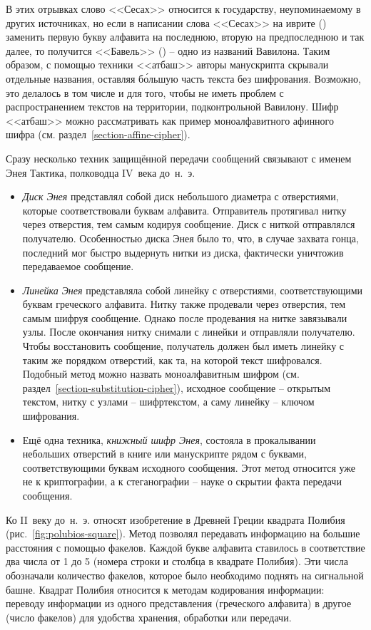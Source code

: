 В этих отрывках слово <<Сесах>> относится к государству, неупоминаемому в других источниках, но если в написании слова <<Сесах>> на иврите () заменить первую букву алфавита на последнюю, вторую на предпоследнюю и так далее, то получится <<Бавель>> () -- одно из названий Вавилона. Таким образом, с помощью техники <<атбаш>> авторы манускрипта скрывали отдельные названия, оставляя б\'{о}льшую часть текста без шифрования. Возможно, это делалось в том числе и для того, чтобы не иметь проблем с распространением текстов на территории, подконтрольной Вавилону. Шифр <<атбаш>> можно рассматривать как пример моноалфавитного афинного шифра (см. раздел~\ref{section-affine-cipher}).

Сразу несколько техник защищённой передачи сообщений связывают с именем Энея Тактика, полководца IV~века до~н.~э.
\begin{itemize}
	\item \emph{Диск Энея} представлял собой диск небольшого диаметра с отверстиями, которые соответствовали буквам алфавита. Отправитель протягивал нитку через отверстия, тем самым кодируя сообщение. Диск с ниткой отправлялся получателю. Особенностью диска Энея было то, что, в случае захвата гонца, последний мог быстро выдернуть нитки из диска, фактически уничтожив передаваемое сообщение.
	\item \emph{Линейка Энея} представляла собой линейку с отверстиями, соответствующими буквам греческого алфавита. Нитку также продевали через отверстия, тем самым шифруя сообщение. Однако после продевания на нитке завязывали узлы. После окончания нитку снимали с линейки и отправляли получателю. Чтобы восстановить сообщение, получатель должен был иметь линейку с таким же порядком отверстий, как та, на которой текст шифровался. Подобный метод можно назвать моноалфавитным шифром (см. раздел~\ref{section-substitution-cipher}), исходное сообщение -- открытым текстом, нитку с узлами -- шифртекстом, а саму линейку -- ключом шифрования.
	\item Ещё одна техника, \emph{книжный шифр Энея}, состояла в прокалывании небольших отверстий в книге или манускрипте рядом с буквами, соответствующими буквам исходного сообщения. Этот метод относится уже не к криптографии, а к стеганографии -- науке о скрытии факта передачи сообщения.
\end{itemize}

Ко II~веку до~н.~э. относят изобретение в Древней Греции квадрата Полибия (рис.~\ref{fig:polubios-square}). Метод позволял передавать информацию на большие расстояния с помощью факелов. Каждой букве алфавита ставилось в соответствие два числа от 1 до 5 (номера строки и столбца в квадрате Полибия). Эти числа обозначали количество факелов, которое было необходимо поднять на сигнальной башне. Квадрат Полибия относится к методам кодирования информации: переводу информации из одного представления (греческого алфавита) в другое (число факелов) для удобства хранения, обработки или передачи.

